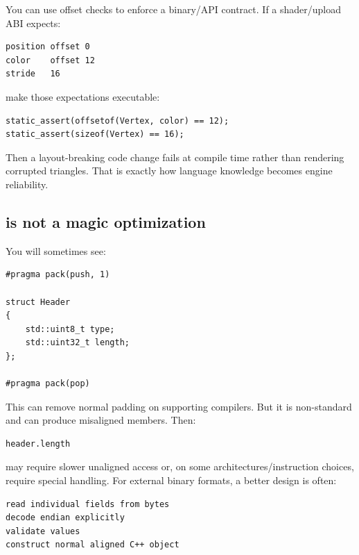 You can use offset checks to enforce a binary/API contract. If a shader/upload ABI expects:

\begin{verbatim}
position offset 0
color    offset 12
stride   16
\end{verbatim}

make those expectations executable:

\begin{verbatim}
static_assert(offsetof(Vertex, color) == 12);
static_assert(sizeof(Vertex) == 16);
\end{verbatim}

Then a layout-breaking code change fails at compile time rather than rendering corrupted triangles. That is exactly how language knowledge becomes engine reliability.

\subsection{\texorpdfstring{ is not a magic optimization}{ is not a magic optimization}}\label{01-foundations-i-ch003-pragma-pack-is-not-a-magic-optimization}

\hypertarget{01-foundations-i-ch003-pragma-pack-is-not-a-magic-optimization}{}

You will sometimes see:

\begin{verbatim}
#pragma pack(push, 1)

struct Header
{
    std::uint8_t type;
    std::uint32_t length;
};

#pragma pack(pop)
\end{verbatim}

This can remove normal padding on supporting compilers. But it is non-standard and can produce misaligned members. Then:

\begin{verbatim}
header.length
\end{verbatim}

may require slower unaligned access or, on some architectures/instruction choices, require special handling. For external binary formats, a better design is often:

\begin{verbatim}
read individual fields from bytes
decode endian explicitly
validate values
construct normal aligned C++ object
\end{verbatim}

